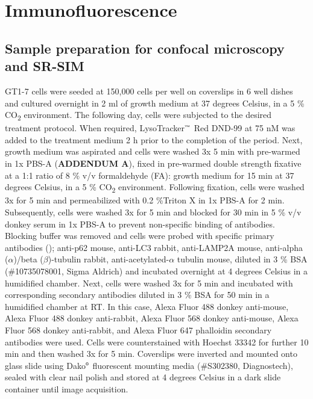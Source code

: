 \section{Immunofluorescence}
\subsection{Sample preparation for confocal microscopy and SR-SIM}
GT1-7 cells were seeded at 150,000 cells per well on coverslips in 6 well dishes and cultured overnight in 2 ml of growth medium at 37 degrees Celsius, in a 5 \% CO\textsubscript{2} environment. The following day, cells were subjected to the desired treatment protocol. When required, LysoTracker${\textsuperscript{\tiny{\texttrademark}}}$ Red DND-99 at 75 nM was added to the treatment medium 2 h prior to the completion of the period. Next, growth medium was aspirated and cells were washed 3x 5 min with pre-warmed in 1x PBS-A (\textbf{ADDENDUM A}), fixed in pre-warmed double strength fixative at a 1:1 ratio of 8 \% v/v formaldehyde (FA): growth medium for 15 min at 37 degrees Celsius, in a 5 \% CO\textsubscript{2} environment. Following fixation, cells were washed 3x for 5 min and permeabilized with 0.2 \%Triton X in 1x PBS-A for 2 min. Subsequently, cells were washed 3x for 5 min and blocked for 30 min in 5 \% v/v donkey serum in 1x PBS-A to prevent non-specific binding of antibodies. Blocking buffer was removed and cells were probed with specific primary antibodies (); anti-p62 mouse, anti-LC3 rabbit, anti-LAMP2A mouse, anti-alpha ($\alpha$)/beta ($\beta$)-tubulin rabbit, anti-acetylated-$\alpha$ tubulin mouse, diluted in 3 \% BSA (\#10735078001, Sigma Aldrich) and incubated overnight at 4 degrees Celsius in a humidified chamber. Next, cells were washed 3x for 5 min and incubated with corresponding secondary antibodies diluted in 3 \% BSA for 50 min in a humidified chamber at RT. In this case, Alexa Fluor 488 donkey anti-mouse, Alexa Fluor 488 donkey anti-rabbit, Alexa Fluor 568 donkey anti-mouse, Alexa Fluor 568 donkey anti-rabbit, and Alexa Fluor 647 phalloidin secondary antibodies were used. Cells were counterstained with Hoechst 33342 for further 10 min and then washed 3x for 5 min. Coverslips were inverted and mounted onto glass slide using Dako${\textsuperscript{\tiny{\textregistered}}}$ fluorescent mounting media (\#S302380, Diagnostech), sealed with clear nail polish and stored at 4 degrees Celsius in a dark slide container until image acquisition.


